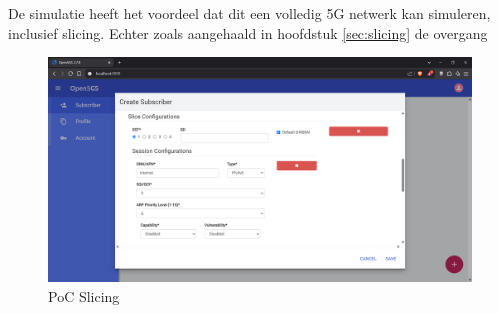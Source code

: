 De simulatie heeft het voordeel dat dit een volledig 5G netwerk kan simuleren, inclusief slicing. Echter zoals aangehaald in hoofdstuk \ref{sec:slicing} de overgang 


\begin{figure}[H]
    \includegraphics[width=\linewidth]{../graphics/POC-Slicing.png}
    \caption{PoC Slicing}
    \label{fig:pocSlicing}
\end{figure}



